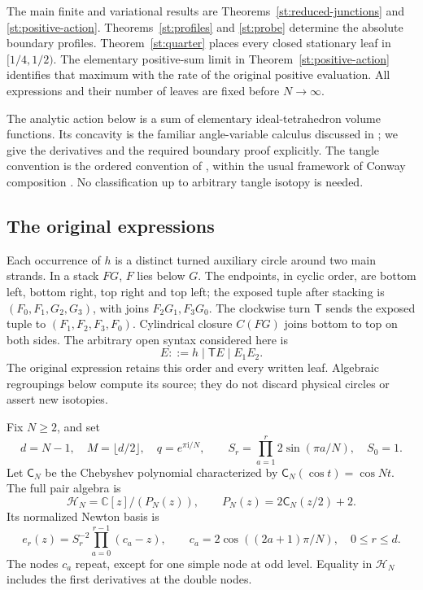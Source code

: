 \documentclass[11pt]{article}
\numberwithin{equation}{section}
\theoremstyle{definition}\newtheorem{definition}[theorem]{Definition}
\theoremstyle{remark}\newtheorem{remark}[theorem]{Remark}
\newcommand{\ii}{\mathrm i}
\newcommand{\CC}{\mathbb C}
\newcommand{\T}{\mathsf T}
\newcommand{\HH}{\mathcal H}
\begin{document}
The main finite and variational results are
Theorems~\ref{st:reduced-junctions} and \ref{st:positive-action}.
Theorems~\ref{st:profiles} and \ref{st:probe} determine the
absolute boundary profiles. Theorem~\ref{st:quarter} places every
closed stationary leaf in $[1/4,1/2)$.
The elementary positive-sum limit in
Theorem~\ref{st:positive-action} identifies that maximum with the
rate of the original positive evaluation. All expressions and their
number of leaves are fixed before $N\to\infty$.

The analytic action below is a sum of elementary ideal-tetrahedron
volume functions. Its concavity is the familiar angle-variable
calculus discussed in \cite{FuterGueritaud}; we give the derivatives
and the required boundary proof explicitly. The tangle convention
is the ordered convention of \cite{Newton}, within the usual
framework of Conway composition \cite{KauffmanLambropoulou}.
No classification up to arbitrary tangle isotopy is needed.

\subsection{The original expressions}
Each occurrence of $h$ is a distinct turned auxiliary circle around
two main strands. In a stack $FG$, $F$ lies below $G$.
The endpoints, in cyclic order, are bottom left, bottom right, top
right and top left; the exposed tuple after stacking is
$(F_0,F_1,G_2,G_3)$, with joins $F_2G_1,F_3G_0$.
The clockwise turn $\T$ sends the exposed tuple to
$(F_1,F_2,F_3,F_0)$. Cylindrical closure $C(FG)$ joins bottom to top
on both sides. The arbitrary open syntax considered here is
\[
 E::=h\mid \T E\mid E_1E_2.
\]
The original expression retains this order and every written leaf.
Algebraic regroupings below compute its source; they do not discard
physical circles or assert new isotopies.

Fix $N\ge2$, and set
\[
 d=N-1,\quad M=\lfloor d/2\rfloor,\quad q=e^{\pi\ii/N},
 \qquad S_r=\prod_{a=1}^r2\sin(\pi a/N),\quad S_0=1.
\]
Let $\mathsf C_N$ be the Chebyshev polynomial characterized by
$\mathsf C_N(\cos t)=\cos Nt$. The full pair algebra is
\[
 \HH_N=\CC[z]/(P_N(z)),\qquad P_N(z)=2\mathsf C_N(z/2)+2.
\]
Its normalized Newton basis is
\[
 e_r(z)=S_r^{-2}\prod_{a=0}^{r-1}(c_a-z),\qquad
 c_a=2\cos((2a+1)\pi/N),\quad 0\le r\le d.
\]
The nodes $c_a$ repeat, except for one simple node at odd level.
Equality in $\HH_N$ includes the first derivatives at the double
nodes.
\end{document}
